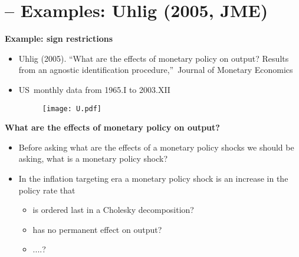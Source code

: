 \documentclass[10pt,handout]{beamer}
\begin{document}
\section{ -- Examples: Uhlig (2005, JME)}

\begin{frame}
{\textbf{Example: sign restrictions}}

\begin{itemize}
\item Uhlig (2005). \textquotedblleft What are the effects of monetary
policy on output? Results from an agnostic identification
procedure,\textquotedblright\ Journal of Monetary Economics\smallskip

\item US\ monthly data from 1965.I to 2003.XII 
\begin{figure}[h]
\centering\texttt{[image: U.pdf]}
\end{figure}
\end{itemize}
\end{frame}

\vspace{.1cm}

\begin{frame}
{\textbf{What are the effects of monetary policy on output?}}

\begin{itemize}
\item Before asking what are the effects of a monetary policy shocks we
should be asking, {{\color{red} what is a monetary policy shock?}}\medskip 
\pause

\item In the inflation targeting era a monetary policy shock is an increase
in the policy rate that

\begin{itemize}
\item is ordered last in a Cholesky decomposition?

\item has no permanent effect on output?

\item ....?
\end{itemize}
\end{itemize}
\end{frame}

\vspace{.1cm}
\end{document}
